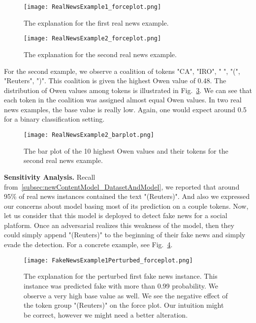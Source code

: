 \begin{figure}
    \centering
    \texttt{[image: RealNewsExample1\_forceplot.png]}
    \caption[The explanation for the first real news example.]{The explanation for the first real news example.}
    \label{fig:RealNewsExample1_forceplot}
\end{figure}
\begin{figure}
    \centering
    \texttt{[image: RealNewsExample2\_forceplot.png]}
    \caption[The explanation for the second real news example.]{The explanation for the second real news example.}
    \label{fig:RealNewsExample2_forceplot}
\end{figure}
For the second example, we observe a coalition of tokens "CA", "IRO", " ", "(", "Reuters", ")". This coalition is given the highest Owen value of 0.48. The distribution of Owen values among tokens is illustrated in Fig.~\ref{fig:RealNewsExample2_barplot}. We can see that each token in the coalition was assigned almost equal Owen values. In two real news examples, the base value is really low. Again, one would expect around 0.5 for a binary classification setting.\\
\begin{figure}
    \centering
    \texttt{[image: RealNewsExample2\_barplot.png]}
    \caption[The bar plot of the 10 highest Owen values and their tokens for the second real news example.]{The bar plot of the 10 highest Owen values and their tokens for the second real news example.}
    \label{fig:RealNewsExample2_barplot}
\end{figure}
\textbf{Sensitivity Analysis.} Recall from~\ref{subsec:newContentModel_DatasetAndModel}, we reported that around 95\% of real news instances contained the text "(Reuters)". And also we expressed our concerns about model basing most of its prediction on a couple tokens. Now, let us consider that this model is deployed to detect fake news for a social platform. Once an adversarial realizes this weakness of the model, then they could simply append "(Reuters)" to the beginning of their fake news and simply evade the detection. For a concrete example, see Fig.~\ref{fig:FakeNewsExample1Perturbed_forceplot}.\\
\begin{figure}
    \centering
    \texttt{[image: FakeNewsExample1Perturbed\_forceplot.png]}
    \caption[The explanation for the perturbed first fake news instance.]{The explanation for the perturbed first fake news instance. This instance was predicted fake with more than 0.99 probability. We observe a very high base value as well. We see the negative effect of the token group "(Reuters)" on the force plot. Our intuition might be correct, however we might need a better alteration.}
    \label{fig:FakeNewsExample1Perturbed_forceplot}
\end{figure}
